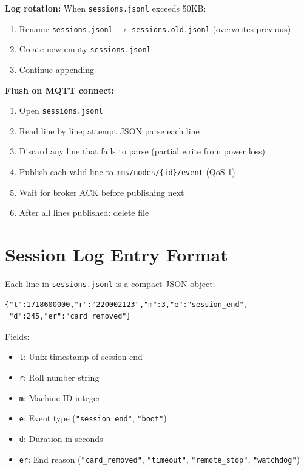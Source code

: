 \textbf{Log rotation:} When \texttt{sessions.jsonl} exceeds 50KB:
\begin{enumerate}[leftmargin=1.5em]
    \item Rename \texttt{sessions.jsonl} $\rightarrow$ \texttt{sessions.old.jsonl} (overwrites previous)
    \item Create new empty \texttt{sessions.jsonl}
    \item Continue appending
\end{enumerate}

\textbf{Flush on MQTT connect:}
\begin{enumerate}[leftmargin=1.5em]
    \item Open \texttt{sessions.jsonl}
    \item Read line by line; attempt JSON parse each line
    \item Discard any line that fails to parse (partial write from power loss)
    \item Publish each valid line to \texttt{mms/nodes/\{id\}/event} (QoS 1)
    \item Wait for broker ACK before publishing next
    \item After all lines published: delete file
\end{enumerate}

\section{Session Log Entry Format}

Each line in \texttt{sessions.jsonl} is a compact JSON object:

\begin{lstlisting}[style=jsonlstyle,caption={Session log entry format}]
{"t":1718600000,"r":"220002123","m":3,"e":"session_end",
 "d":245,"er":"card_removed"}
\end{lstlisting}

Fields:
\begin{itemize}[leftmargin=1.5em,noitemsep]
    \item \texttt{t}: Unix timestamp of session end
    \item \texttt{r}: Roll number string
    \item \texttt{m}: Machine ID integer
    \item \texttt{e}: Event type (\texttt{"session\_end"}, \texttt{"boot"})
    \item \texttt{d}: Duration in seconds
    \item \texttt{er}: End reason (\texttt{"card\_removed"}, \texttt{"timeout"}, \texttt{"remote\_stop"}, \texttt{"watchdog"})
\end{itemize}


